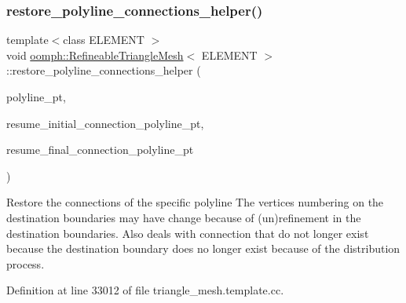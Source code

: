 \mbox{\label{classoomph_1_1RefineableTriangleMesh_ad88a1e3f1d31392623f348d8a4718a56}} 
\subsubsection{\texorpdfstring{restore\+\_\+polyline\+\_\+connections\+\_\+helper()}{restore\_polyline\_connections\_helper()}}
{\footnotesize\ttfamily template$<$class E\+L\+E\+M\+E\+NT $>$ \\
void \hyperlink{classoomph_1_1RefineableTriangleMesh}{oomph\+::\+Refineable\+Triangle\+Mesh}$<$ E\+L\+E\+M\+E\+NT $>$\+::restore\+\_\+polyline\+\_\+connections\+\_\+helper (\begin{DoxyParamCaption}\item[{\hyperlink{classoomph_1_1TriangleMeshPolyLine}{Triangle\+Mesh\+Poly\+Line} $\ast$}]{polyline\+\_\+pt,  }\item[{\hyperlink{classoomph_1_1Vector}{Vector}$<$ \hyperlink{classoomph_1_1TriangleMeshPolyLine}{Triangle\+Mesh\+Poly\+Line} $\ast$$>$ \&}]{resume\+\_\+initial\+\_\+connection\+\_\+polyline\+\_\+pt,  }\item[{\hyperlink{classoomph_1_1Vector}{Vector}$<$ \hyperlink{classoomph_1_1TriangleMeshPolyLine}{Triangle\+Mesh\+Poly\+Line} $\ast$$>$ \&}]{resume\+\_\+final\+\_\+connection\+\_\+polyline\+\_\+pt }\end{DoxyParamCaption})\hspace{0.3cm}{\ttfamily [protected]}}



Restore the connections of the specific polyline The vertices numbering on the destination boundaries may have change because of (un)refinement in the destination boundaries. Also deals with connection that do not longer exist because the destination boundary does no longer exist because of the distribution process. 



Definition at line 33012 of file triangle\+\_\+mesh.\+template.\+cc.



